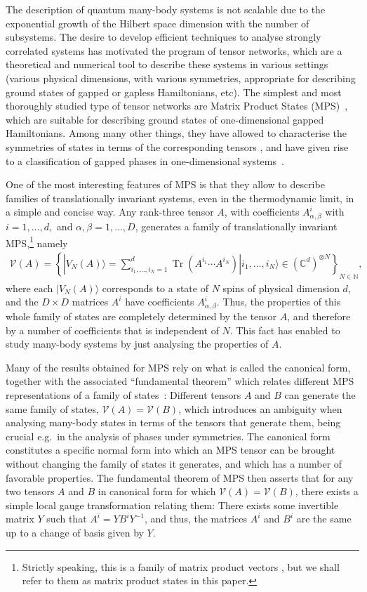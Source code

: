 \documentclass[pra,a4paper,notitlepage,nofootinbib,superscriptaddress]{revtex4-1}
\theoremstyle{plain}
\newcommand{\1}{{\openone}}
\newcommand{\be}{\begin{eqnarray}}
\newcommand{\ee}{\end{eqnarray}}
\newcommand{\ra}{\rangle}
\newcommand{\mc}{\mathcal}
\DeclareMathOperator{\tr}{Tr}
\begin{document}
The description of quantum many-body systems is not scalable due to the
exponential growth of the Hilbert space dimension with the number of subsystems.
The desire to develop efficient techniques to analyse strongly correlated
systems has motivated the program of tensor networks, which are a
theoretical and numerical tool \cite{Ve08,Or14b} to describe these systems
in various settings (various physical dimensions, with various symmetries,
appropriate for describing ground states of gapped or gapless
Hamiltonians, etc).  The simplest and most thoroughly studied type of tensor
networks are Matrix Product States (MPS)~\cite{Fa92,Sc11d,Pe07}, which are
suitable for describing ground states of one-dimensional gapped
Hamiltonians.  Among many other things, they have allowed to characterise the
symmetries of states in terms of the corresponding tensors
\cite{Pe08}, and have given rise to a classification of gapped phases in
one-dimensional systems~\cite{Ch11,Sc11,Po10}.



One of the most interesting features of MPS is that they allow to describe
families of  translationally invariant systems, even in the thermodynamic
limit, in a simple and concise way. Any rank-three tensor $A$, with
coefficients $A^i_{\alpha,\beta}$ with  $i=1,\ldots,d,$ and
$\alpha,\beta=1,\ldots,D$,  generates a family of translationally
invariant MPS,\footnote{Strictly speaking, this is a family of matrix
    product vectors \cite{Ci15}, but we shall refer to them as matrix product
    states in this paper.} namely
\be
    \mc{V}(A)=\left\{
    |V_N(A)\ra = \sum_{i_1,\ldots, i_N=1}^d\tr(A^{i_1}\cdots A^{i_N})|i_1,\ldots, i_N\ra\in (\mathbb{C}^d)^{\otimes N}\right\}_{N\in \mathbb{N}},
    \label{eq:VA}
\ee
where each $ |V_N(A)\ra$ corresponds to a state of $N$ spins of physical
dimension $d$,  and the $D\times D$ matrices $A^i$ have coefficients
$A^i_{\alpha,\beta}$. Thus, the properties of this whole family of states
are completely determined by the tensor $A$, and therefore by a number of
coefficients that is independent of $N$.  This fact has enabled to study
many-body systems by just analysing the properties of $A$.

Many of the results obtained for MPS rely on what is called the canonical
form, together with the associated ``fundamental theorem'' which relates different
MPS representations of a family of states~\cite{Ci15}:
Different tensors $A$ and $B$ can generate the same family of states,
$\mc{V}(A)=\mc{V}(B)$,  which introduces an ambiguity when analysing
many-body states in terms of the tensors that generate them, being
crucial e.g.\ in the analysis of phases under symmetries.  The
canonical form constitutes a specific normal form into which an MPS
tensor can be brought without changing the family of states it generates,
and which has a number of favorable properties.  The fundamental
theorem of MPS then asserts that for any two tensors $A$ and $B$ in
canonical form for which $\mc{V}(A)=\mc{V}(B)$, there exists a simple
local gauge transformation relating them: There exists some invertible
matrix $Y$ such that $A^i=Y B^i Y^{-1}$, and thus, the matrices $A^i$ and
$B^i$ are the same up to a change of basis given by $Y$.
\end{document}
